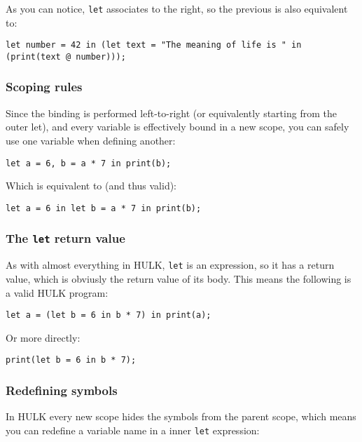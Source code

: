 \documentclass[a4paper, 12pt]{report}
\begin{document}
As you can notice, {\tt let} associates to the right, so the previous is also equivalent to:

\begin{lstlisting}
let number = 42 in (let text = "The meaning of life is " in (print(text @ number)));
\end{lstlisting}

\subsubsection*{Scoping rules}

Since the binding is performed left-to-right (or equivalently starting from the outer let), and every
variable is effectively bound in a new scope, you can safely use one variable when defining another:

\begin{lstlisting}
let a = 6, b = a * 7 in print(b);
\end{lstlisting}

Which is equivalent to (and thus valid):

\begin{lstlisting}
let a = 6 in let b = a * 7 in print(b);
\end{lstlisting}

\subsubsection*{The {\tt let} return value}

As with almost everything in HULK, {\tt let} is an expression, so it has a return value, which is obviusly the return
value of its body. This means the following is a valid HULK program:

\begin{lstlisting}
let a = (let b = 6 in b * 7) in print(a);
\end{lstlisting}

Or more directly:

\begin{lstlisting}
print(let b = 6 in b * 7);
\end{lstlisting}

\subsubsection*{Redefining symbols}

In HULK every new scope hides the symbols from the parent scope, which means you can redefine a variable name
in a inner {\tt let} expression:
\end{document}
